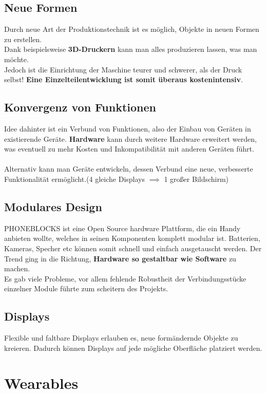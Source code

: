 \documentclass[a4paper]{article}
\begin{document}
\subsection{Neue Formen}
Durch neue Art der Produktionstechnik ist es möglich, Objekte in neuen Formen zu erstellen.\\
Dank beispielsweise \textbf{3D-Druckern} kann man alles produzieren lassen, was man möchte.\\

Jedoch ist die Einrichtung der Maschine teurer und schwerer, als der Druck selbst! \textbf{Eine Einzelteilentwicklung ist somit überaus kostenintensiv}.

\subsection{Konvergenz von Funktionen}
Idee dahinter ist ein Verbund von Funktionen, also der Einbau von Geräten in existierende Geräte. \textbf{Hardware} kann durch weitere Hardware erweitert werden, was eventuell zu mehr Kosten und Inkompatibilität mit anderen Geräten führt.\\
\\
Alternativ kann man Geräte entwickeln, dessen Verbund eine neue, verbesserte Funktionalität ermöglicht.(4 gleiche Displays $\implies$ 1 großer Bildschirm)  

\subsection{Modulares Design}
PHONEBLOCKS ist eine Open Source hardware Plattform, die ein Handy anbieten wollte, welches in seinen Komponenten komplett modular ist. Batterien, Kameras, Specher etc können somit schnell und einfach ausgetauscht werden. Der Trend ging in die Richtung, \textbf{Hardware so gestaltbar wie Software} zu machen. \\

Es gab viele Probleme, vor allem fehlende Robustheit der Verbindungsstücke einzelner Module führte zum scheitern des Projekts.

\subsection{Displays}
Flexible und faltbare Displays erlauben es, neue formändernde Objekte zu kreieren. Dadurch können Displays auf jede mögliche Oberfläche platziert werden. 

\newpage
\section{Wearables}
\newpage
\end{document}
